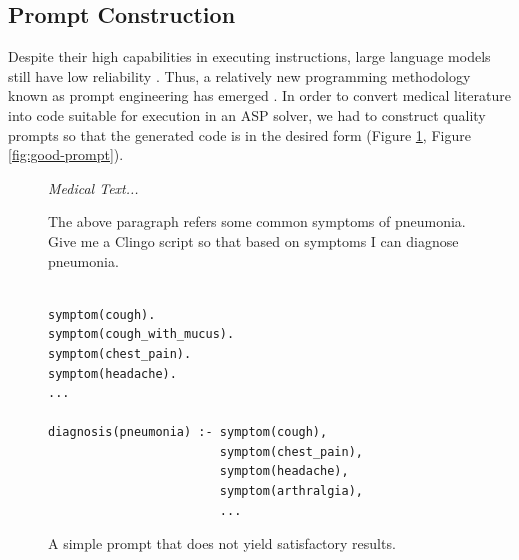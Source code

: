 \documentclass[10pt,leqno]{amsart}
\newenvironment{commandline}{
	\medskip
	\begin{mdframed}[style=commandline]
}{
	\end{mdframed}
	\medskip
}
\newenvironment{prompt}[1][Prompt:]{ %
	\medskip
	\begin{mdframed}[style=warning]
		\noindent{\textbf{#1}}
}{
	\end{mdframed}
}
\begin{document}
\subsection{Prompt Construction}

Despite their high capabilities in executing instructions, large language
models still have low reliability \cite{bowman2023things}. Thus, a relatively
new programming methodology known as prompt engineering has emerged
\cite{liu2021pretrain, promptingguidePromptEngineering}. In order to convert
medical literature into code suitable for execution in an ASP solver, we had to
construct quality prompts so that the generated code is in the desired form
(Figure \ref{fig:bad-prompt}, Figure \ref{fig:good-prompt}).

\begin{figure}[!h]
\centering
\begin{prompt}
\textit{Medical Text...}

The above paragraph refers some common symptoms of pneumonia.
Give me a Clingo script so that based on symptoms I can diagnose pneumonia.
\end{prompt}


\begin{commandline}
\begin{verbatim}

symptom(cough).
symptom(cough_with_mucus).
symptom(chest_pain).
symptom(headache).
...

diagnosis(pneumonia) :- symptom(cough), 
                        symptom(chest_pain), 
                        symptom(headache), 
                        symptom(arthralgia),
                        ...
\end{verbatim}
\end{commandline}

\caption{A simple prompt that does not yield satisfactory results.}
\label{fig:bad-prompt}
\end{figure}
\end{document}
